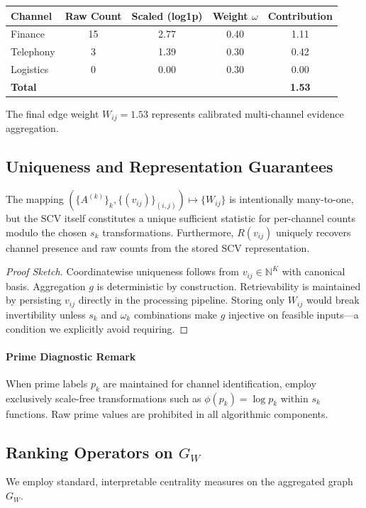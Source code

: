 \documentclass[12pt]{article}
\theoremstyle{plain}
\begin{document}
\begin{center}
\begin{tabular}{lcccc}
\toprule
Channel & Raw Count & Scaled (log1p) & Weight $\omega$ & Contribution \\
\midrule
Finance   & 15 & 2.77 & 0.40 & 1.11 \\
Telephony &  3 & 1.39 & 0.30 & 0.42 \\
Logistics &  0 & 0.00 & 0.30 & 0.00 \\
\midrule
\textbf{Total} & & & & \textbf{1.53} \\
\bottomrule
\end{tabular}
\end{center}
\noindent The final edge weight $W_{ij}=1.53$ represents calibrated multi-channel evidence aggregation.

\subsection{Uniqueness and Representation Guarantees}
\begin{proposition}
\label{prop:scv-unique}
The mapping $(\{A^{(k)}\}_{k}, \{(v_{ij})\}_{(i,j)}) \mapsto \{W_{ij}\}$ is intentionally many-to-one, but the SCV itself constitutes a unique sufficient statistic for per-channel counts modulo the chosen $s_k$ transformations. Furthermore, $R(v_{ij})$ uniquely recovers channel presence and raw counts from the stored SCV representation.
\end{proposition}
\begin{proof}[Proof Sketch]
Coordinatewise uniqueness follows from $v_{ij}\in\mathbb{N}^K$ with canonical basis. Aggregation $g$ is deterministic by construction. Retrievability is maintained by persisting $v_{ij}$ directly in the processing pipeline. Storing only $W_{ij}$ would break invertibility unless $s_k$ and $\omega_k$ combinations make $g$ injective on feasible inputs—a condition we explicitly avoid requiring.
\end{proof}

\paragraph{Prime Diagnostic Remark}
When prime labels $p_k$ are maintained for channel identification, employ exclusively scale-free transformations such as $\phi(p_k)=\log p_k$ within $s_k$ functions. Raw prime values are prohibited in all algorithmic components.

\subsection{Ranking Operators on $G_W$}
We employ standard, interpretable centrality measures on the aggregated graph $G_W$.
\end{document}
